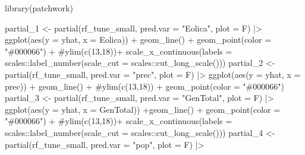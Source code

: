 \documentclass[
]{report}
\newenvironment{Shaded}{\begin{snugshade}}{\end{snugshade}}
\newcommand{\AttributeTok}[1]{\textcolor[rgb]{0.40,0.45,0.13}{#1}}
\newcommand{\CommentTok}[1]{\textcolor[rgb]{0.37,0.37,0.37}{#1}}
\newcommand{\FunctionTok}[1]{\textcolor[rgb]{0.28,0.35,0.67}{#1}}
\newcommand{\NormalTok}[1]{\textcolor[rgb]{0.00,0.23,0.31}{#1}}
\newcommand{\OtherTok}[1]{\textcolor[rgb]{0.00,0.23,0.31}{#1}}
\newcommand{\SpecialCharTok}[1]{\textcolor[rgb]{0.37,0.37,0.37}{#1}}
\newcommand{\StringTok}[1]{\textcolor[rgb]{0.13,0.47,0.30}{#1}}
\begin{document}
\begin{Shaded}
\begin{Highlighting}[]
\FunctionTok{library}\NormalTok{(patchwork)}

\NormalTok{partial\_1 }\OtherTok{\textless{}{-}} \FunctionTok{partial}\NormalTok{(rf\_tune\_small, }\AttributeTok{pred.var =} \StringTok{"Eolica"}\NormalTok{, }\AttributeTok{plot =}\NormalTok{ F) }\SpecialCharTok{|\textgreater{}} 
  \FunctionTok{ggplot}\NormalTok{(}\FunctionTok{aes}\NormalTok{(}\AttributeTok{y =}\NormalTok{ yhat, }\AttributeTok{x =}\NormalTok{ Eolica)) }\SpecialCharTok{+} \FunctionTok{geom\_line}\NormalTok{() }\SpecialCharTok{+}
  \FunctionTok{geom\_point}\NormalTok{(}\AttributeTok{color =} \StringTok{"\#000066"}\NormalTok{) }\SpecialCharTok{+} \CommentTok{\#ylim(c(13,18))+}
  \FunctionTok{scale\_x\_continuous}\NormalTok{(}\AttributeTok{labels =}\NormalTok{ scales}\SpecialCharTok{::}\FunctionTok{label\_number}\NormalTok{(}\AttributeTok{scale\_cut =}\NormalTok{ scales}\SpecialCharTok{::}\FunctionTok{cut\_long\_scale}\NormalTok{()))}
\NormalTok{partial\_2 }\OtherTok{\textless{}{-}} \FunctionTok{partial}\NormalTok{(rf\_tune\_small, }\AttributeTok{pred.var =} \StringTok{"prec"}\NormalTok{, }\AttributeTok{plot =}\NormalTok{ F) }\SpecialCharTok{|\textgreater{}} 
  \FunctionTok{ggplot}\NormalTok{(}\FunctionTok{aes}\NormalTok{(}\AttributeTok{y =}\NormalTok{ yhat, }\AttributeTok{x =}\NormalTok{ prec)) }\SpecialCharTok{+} \FunctionTok{geom\_line}\NormalTok{() }\SpecialCharTok{+} \CommentTok{\#ylim(c(13,18)) +}
  \FunctionTok{geom\_point}\NormalTok{(}\AttributeTok{color =} \StringTok{"\#000066"}\NormalTok{) }
\NormalTok{partial\_3 }\OtherTok{\textless{}{-}} \FunctionTok{partial}\NormalTok{(rf\_tune\_small, }\AttributeTok{pred.var =} \StringTok{"GenTotal"}\NormalTok{, }\AttributeTok{plot =}\NormalTok{ F) }\SpecialCharTok{|\textgreater{}} 
  \FunctionTok{ggplot}\NormalTok{(}\FunctionTok{aes}\NormalTok{(}\AttributeTok{y =}\NormalTok{ yhat, }\AttributeTok{x =}\NormalTok{ GenTotal)) }\SpecialCharTok{+}\FunctionTok{geom\_line}\NormalTok{() }\SpecialCharTok{+}
  \FunctionTok{geom\_point}\NormalTok{(}\AttributeTok{color =} \StringTok{"\#000066"}\NormalTok{) }\SpecialCharTok{+} \CommentTok{\#ylim(c(13,18))+}
  \FunctionTok{scale\_x\_continuous}\NormalTok{(}\AttributeTok{labels =}\NormalTok{ scales}\SpecialCharTok{::}\FunctionTok{label\_number}\NormalTok{(}\AttributeTok{scale\_cut =}\NormalTok{ scales}\SpecialCharTok{::}\FunctionTok{cut\_long\_scale}\NormalTok{()))}
\NormalTok{partial\_4 }\OtherTok{\textless{}{-}} \FunctionTok{partial}\NormalTok{(rf\_tune\_small, }\AttributeTok{pred.var =} \StringTok{"pop"}\NormalTok{, }\AttributeTok{plot =}\NormalTok{ F) }\SpecialCharTok{|\textgreater{}} 

\end{Highlighting}
\end{Shaded}
\end{document}
